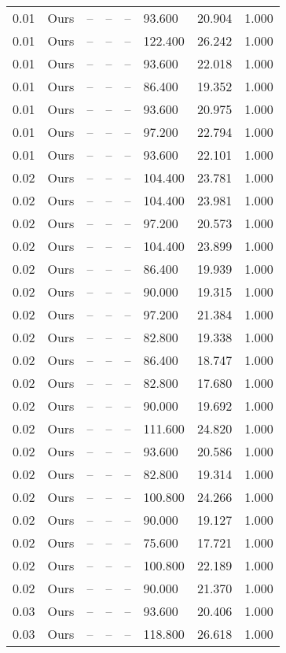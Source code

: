 \begin{table}[H]
\begin{tabular}{l c l l l}
0.01 & Ours & -- & -- & -- & 93.600 & 20.904 & 1.000 \\
0.01 & Ours & -- & -- & -- & 122.400 & 26.242 & 1.000 \\
0.01 & Ours & -- & -- & -- & 93.600 & 22.018 & 1.000 \\
0.01 & Ours & -- & -- & -- & 86.400 & 19.352 & 1.000 \\
0.01 & Ours & -- & -- & -- & 93.600 & 20.975 & 1.000 \\
0.01 & Ours & -- & -- & -- & 97.200 & 22.794 & 1.000 \\
0.01 & Ours & -- & -- & -- & 93.600 & 22.101 & 1.000 \\
0.02 & Ours & -- & -- & -- & 104.400 & 23.781 & 1.000 \\
0.02 & Ours & -- & -- & -- & 104.400 & 23.981 & 1.000 \\
0.02 & Ours & -- & -- & -- & 97.200 & 20.573 & 1.000 \\
0.02 & Ours & -- & -- & -- & 104.400 & 23.899 & 1.000 \\
0.02 & Ours & -- & -- & -- & 86.400 & 19.939 & 1.000 \\
0.02 & Ours & -- & -- & -- & 90.000 & 19.315 & 1.000 \\
0.02 & Ours & -- & -- & -- & 97.200 & 21.384 & 1.000 \\
0.02 & Ours & -- & -- & -- & 82.800 & 19.338 & 1.000 \\
0.02 & Ours & -- & -- & -- & 86.400 & 18.747 & 1.000 \\
0.02 & Ours & -- & -- & -- & 82.800 & 17.680 & 1.000 \\
0.02 & Ours & -- & -- & -- & 90.000 & 19.692 & 1.000 \\
0.02 & Ours & -- & -- & -- & 111.600 & 24.820 & 1.000 \\
0.02 & Ours & -- & -- & -- & 93.600 & 20.586 & 1.000 \\
0.02 & Ours & -- & -- & -- & 82.800 & 19.314 & 1.000 \\
0.02 & Ours & -- & -- & -- & 100.800 & 24.266 & 1.000 \\
0.02 & Ours & -- & -- & -- & 90.000 & 19.127 & 1.000 \\
0.02 & Ours & -- & -- & -- & 75.600 & 17.721 & 1.000 \\
0.02 & Ours & -- & -- & -- & 100.800 & 22.189 & 1.000 \\
0.02 & Ours & -- & -- & -- & 90.000 & 21.370 & 1.000 \\
0.03 & Ours & -- & -- & -- & 93.600 & 20.406 & 1.000 \\
0.03 & Ours & -- & -- & -- & 118.800 & 26.618 & 1.000 \\

\end{tabular}
\end{table}
